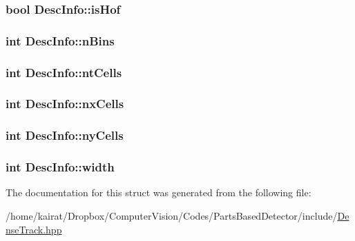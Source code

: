 \subsubsection[{is\+Hof}]{\setlength{\rightskip}{0pt plus 5cm}bool Desc\+Info\+::is\+Hof}\label{structDescInfo_af63bbafd7460d3a13a1aed41ce3abcdd}
\hypertarget{structDescInfo_a2bde776874112f43d29da2d9f41a1e59}{}
\subsubsection[{n\+Bins}]{\setlength{\rightskip}{0pt plus 5cm}int Desc\+Info\+::n\+Bins}\label{structDescInfo_a2bde776874112f43d29da2d9f41a1e59}
\hypertarget{structDescInfo_a2b010679bbd0b353d53164c5cea4fa8e}{}
\subsubsection[{nt\+Cells}]{\setlength{\rightskip}{0pt plus 5cm}int Desc\+Info\+::nt\+Cells}\label{structDescInfo_a2b010679bbd0b353d53164c5cea4fa8e}
\hypertarget{structDescInfo_ab00ff5d070ae53d16577e8578d624c7e}{}
\subsubsection[{nx\+Cells}]{\setlength{\rightskip}{0pt plus 5cm}int Desc\+Info\+::nx\+Cells}\label{structDescInfo_ab00ff5d070ae53d16577e8578d624c7e}
\hypertarget{structDescInfo_a303f14d681cfc8a65d95d05c5ba77e52}{}
\subsubsection[{ny\+Cells}]{\setlength{\rightskip}{0pt plus 5cm}int Desc\+Info\+::ny\+Cells}\label{structDescInfo_a303f14d681cfc8a65d95d05c5ba77e52}
\hypertarget{structDescInfo_a4a2030ba863d45e2495e5f9dfafbe4b0}{}
\subsubsection[{width}]{\setlength{\rightskip}{0pt plus 5cm}int Desc\+Info\+::width}\label{structDescInfo_a4a2030ba863d45e2495e5f9dfafbe4b0}


The documentation for this struct was generated from the following file\+:\begin{DoxyCompactItemize}
\item 
/home/kairat/\+Dropbox/\+Computer\+Vision/\+Codes/\+Parts\+Based\+Detector/include/\hyperlink{DenseTrack_8hpp}{Dense\+Track.\+hpp}\end{DoxyCompactItemize}

